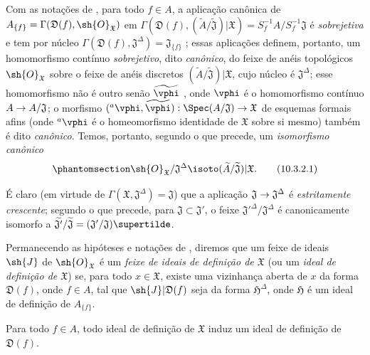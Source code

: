 \documentclass[oneside]{amsart}
\makeatletter
\newcommand{\ega@arrow}[2]{\mathchoice{#1}{#2}{#2}{#2}}
\renewcommand{\to}{\ega@arrow{\longrightarrow}{\rightarrow}}
\newcommand{\oldpage}[2][]{{\marginnote{\normalfont\textbf{#1}~|~#2}}\ignorespaces}
\let\EGAOriginalLabel\label
\renewcommand{\label}[1]{\phantomsection\EGAOriginalLabel{#1}}
\makeatother
\begin{document}
\oldpage[I]{184}
\begin{env}[10.3.2]
\label{I.10.3.2}
Com as notações de , para todo $f\in A$, a aplicação canônica de $A_{\{f\}}=\Gamma(\mathfrak{D}(f),\sh{O}_\mathfrak{X})$ em $\Gamma(\mathfrak{D}(f),(\widetilde{A}/\widetilde{\mathfrak{J}})|\mathfrak{X})=S_f^{-1}A/S_f^{-1}\mathfrak{J}$ é \emph{sobrejetiva} e tem por núcleo $\Gamma(\mathfrak{D}(f),\mathfrak{J}^\Delta)=\mathfrak{J}_{\{f\}}$ ; essas aplicações definem, portanto, um homomorfismo contínuo \emph{sobrejetivo}, dito \emph{canônico}, do feixe de anéis topológicos $\sh{O}_\mathfrak{X}$ sobre o feixe de anéis discretos $(\widetilde{A}/\widetilde{\mathfrak{J}})|\mathfrak{X}$, cujo núcleo é $\mathfrak{J}^\Delta$; esse homomorfismo não é outro senão $\widetilde{\vphi}$ , onde $\vphi$ é o homomorfismo contínuo $A\to A/\mathfrak{J}$; o morfismo $({}^a\vphi,\widetilde{\vphi}):\Spec(A/\mathfrak{J})\to\mathfrak{X}$ de esquemas formais afins (onde ${}^a\vphi$ é o homeomorfismo identidade de $\mathfrak{X}$ sobre si mesmo) também é dito \emph{canônico}.
Temos, portanto, segundo o que precede, um \emph{isomorfismo canônico}
\[
\label{I.10.3.2.1}
  \sh{O}_\mathfrak{X}/\mathfrak{J}^\Delta\isoto(\widetilde{A}/\widetilde{\mathfrak{J}})|\mathfrak{X}.
  \tag{10.3.2.1}
\]

É claro (em virtude de $\Gamma(\mathfrak{X},\mathfrak{J}^\Delta)=\mathfrak{J}$) que a aplicação $\mathfrak{J}\to\mathfrak{J}^\Delta$ é \emph{estritamente crescente}; segundo o que precede, para $\mathfrak{J}\subset\mathfrak{J}'$, o feixe ${\mathfrak{J}'}^\Delta/\mathfrak{J}^\Delta$ é canonicamente isomorfo a $\widetilde{\mathfrak{J}'}/\widetilde{\mathfrak{J}}=(\mathfrak{J}'/\mathfrak{J})\supertilde$.
\end{env}

\begin{env}[10.3.3]
\label{I.10.3.3}
Permanecendo as hipóteses e notações de , diremos que um feixe de ideais $\sh{J}$ de $\sh{O}_\mathfrak{X}$ é um \emph{feixe de ideais de definição de $\mathfrak{X}$} (ou um \emph{ideal de definição de $\mathfrak{X}$}) se, para todo $x\in\mathfrak{X}$, existe uma vizinhança aberta de $x$ da forma $\mathfrak{D}(f)$, onde $f\in A$, tal que $\sh{J}|\mathfrak{D}(f)$ seja da forma $\mathfrak{H}^\Delta$, onde $\mathfrak{H}$ é um ideal de definição de $A_{\{f\}}$.
\end{env}

\begin{proposition}[10.3.4]
\label{I.10.3.4}
Para todo $f\in A$, todo ideal de definição de $\mathfrak{X}$ induz um ideal de definição de $\mathfrak{D}(f)$.
\end{proposition}
\end{document}
